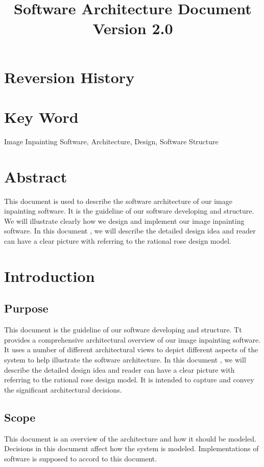 \documentclass[12pt]{article}
\title{Software Architecture Document\\Version 2.0}
\begin{document}
\maketitle

\section*{Reversion History}
\section*{Key Word} Image Inpainting Software, Architecture, Design, Software Structure
\section*{Abstract}
\qquad This document is used to describe the software architecture of our image inpainting software. It is the guideline of our software developing and structure. We will illustrate clearly how we design and implement our image inpainting software. In this document , we will describe the detailed design idea and reader can have a clear picture with referring to the rational rose design model.

\newpage
\tableofcontents
\newpage

\section{Introduction}
\subsection{Purpose}
\qquad This document is the guideline of our software developing and structure. Tt provides a comprehensive architectural overview of our image inpainting software.  It uses a number of different architectural views to depict different aspects of the system to help illustrate the software architecture. In this document , we will describe the detailed design idea and reader can have a clear picture with referring to the rational rose design model. It is intended to capture and convey the significant architectural decisions.
\subsection{Scope}
\qquad This document is an overview of the architecture and how it should be modeled. Decisions in this document affect how the system is modeled. Implementations of software is supposed to accord to this document.
\end{document}
